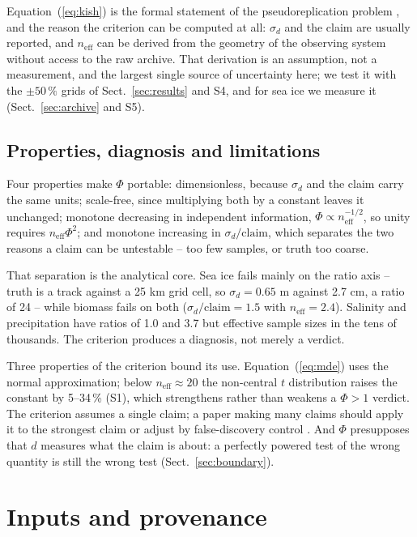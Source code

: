 \documentclass[preprint,12pt,authoryear]{elsarticle}
\begin{document}
Equation~(\ref{eq:kish}) is the formal statement of the pseudoreplication problem \citep{hurlbert1984pseudoreplication,legendre1993spatial}, and the reason the criterion can be computed at all: $\sigma_d$ and the claim are usually reported, and $n_{\mathrm{eff}}$ can be derived from the geometry of the observing system without access to the raw archive. That derivation is an assumption, not a measurement, and the largest single source of uncertainty here; we test it with the $\pm 50\,\%$ grids of Sect.~\ref{sec:results} and S4, and for sea ice we measure it (Sect.~\ref{sec:archive} and S5).

\subsection{Properties, diagnosis and limitations}

Four properties make $\Phi$ portable: dimensionless, because $\sigma_d$ and the claim carry the same units; scale-free, since multiplying both by a constant leaves it unchanged; monotone decreasing in independent information, $\Phi \propto n_{\mathrm{eff}}^{-1/2}$, so unity requires $n_{\mathrm{eff}}\Phi^{2}$; and monotone increasing in $\sigma_d/\mathrm{claim}$, which separates the two reasons a claim can be untestable -- too few samples, or truth too coarse.

That separation is the analytical core. Sea ice fails mainly on the ratio axis -- truth is a track against a 25 km grid cell, so $\sigma_d = 0.65$ m against 2.7 cm, a ratio of 24 -- while biomass fails on both ($\sigma_d/\mathrm{claim} = 1.5$ with $n_{\mathrm{eff}} = 2.4$). Salinity and precipitation have ratios of 1.0 and 3.7 but effective sample sizes in the tens of thousands. The criterion produces a diagnosis, not merely a verdict.

Three properties of the criterion bound its use. Equation~(\ref{eq:mde}) uses the normal approximation; below $n_{\mathrm{eff}} \approx 20$ the non-central $t$ distribution raises the constant by 5--34\,\% (S1), which strengthens rather than weakens a $\Phi>1$ verdict. The criterion assumes a single claim; a paper making many claims should apply it to the strongest claim or adjust by false-discovery control \citep{benjamini1995controlling,storey2002direct}. And $\Phi$ presupposes that $d$ measures what the claim is about: a perfectly powered test of the wrong quantity is still the wrong test (Sect.~\ref{sec:boundary}).

\section{Inputs and provenance}
\label{sec:methods}
\end{document}
